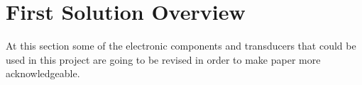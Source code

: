 \section{First Solution Overview}\label{sec:electronic-background}
		At this section some of the electronic components and transducers that could be used in this project are going to be revised in order to make paper more acknowledgeable.
	
	
	
	
	
	
	
	
	